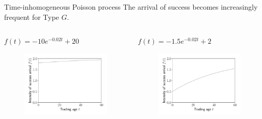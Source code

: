 \documentclass{beamer}
\begin{document}
\begin{frame}[allowframebreaks]{Time-inhomogeneous Poisson process}
The arrival of success becomes increasingly frequent for Type $G$.

	\begin{columns}[t]
		\begin{column}{0.49\textwidth}
			\begin{block}{$f(t)=-10e^{-0.02t}+20$}
				\begin{figure}
					\includegraphics[width=\linewidth]{figures/funcf2}
				\end{figure}
			\end{block}  
		\end{column}
	
	\begin{column}{0.49\textwidth}
					\begin{block}{$f(t)=-1.5e^{-0.02t}+2$}
			\begin{figure}
				\includegraphics[width=\linewidth]{figures/funcf1}
			\end{figure}
		\end{block}  
	\end{column}
\end{columns}


\end{frame}
\end{document}
